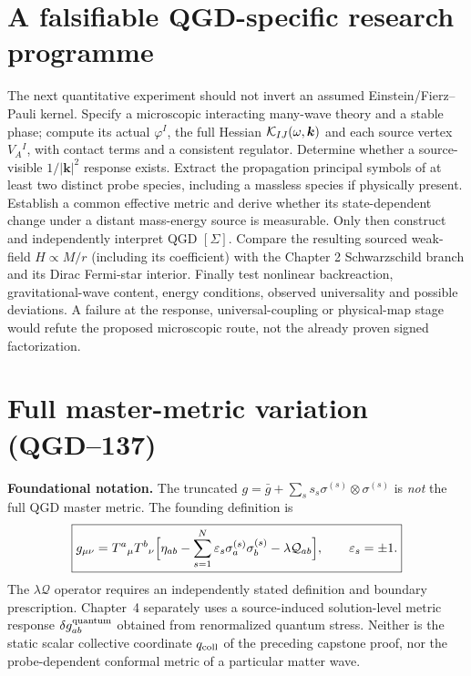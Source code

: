 \documentclass[11pt,a4paper]{article}
\theoremstyle{remark}\newtheorem{remark}[theorem]{Remark}
\begin{document}
\section{A falsifiable QGD-specific research programme}
The next quantitative experiment should not invert an assumed Einstein/Fierz--Pauli kernel. Specify a microscopic interacting many-wave theory and a stable phase; compute its actual $\varphi^I$, the full Hessian $\mathcal K_{IJ}(\omega,\bm k)$ and each source vertex $V_A{}^I$, with contact terms and a consistent regulator. Determine whether a source-visible $1/|\bm k|^2$ response exists. Extract the propagation principal symbols of at least two distinct probe species, including a massless species if physically present. Establish a common effective metric and derive whether its state-dependent change under a distant mass-energy source is measurable. Only then construct and independently interpret QGD $[\Sigma]$. Compare the resulting sourced weak-field $H\propto M/r$ (including its coefficient) with the Chapter 2 Schwarzschild branch and its Dirac Fermi-star interior. Finally test nonlinear backreaction, gravitational-wave content, energy conditions, observed universality and possible deviations. A failure at the response, universal-coupling or physical-map stage would refute the proposed microscopic route, not the already proven signed factorization.



\section{Full master-metric variation (QGD--137)}
\label{sec:v32-fullmaster}
\textbf{Foundational notation.} The truncated
$g=\bar g+\sum_s s_s\sigma^{(s)}\otimes\sigma^{(s)}$
is \emph{not} the full QGD master metric. The founding definition is
\begin{equation}\label{eq:v32-master}
\boxed{g_{\mu\nu}=T^a{}_{\mu}T^b{}_{\nu}
\Bigl[\eta_{ab}-\sum_{s=1}^N\varepsilon_s
\sigma_a^{(s)}\sigma_b^{(s)}-\lambda\mathcal Q_{ab}\Bigr],
\qquad \varepsilon_s=\pm1.}
\end{equation}
The $\lambda\mathcal Q$ operator requires an independently
stated definition and boundary prescription. Chapter~4 separately
uses a source-induced solution-level metric response $\delta g^{\rm quantum}_{ab}$ obtained from
renormalized quantum stress. Neither is the static scalar collective
coordinate $q_{\rm coll}$ of the preceding capstone proof, nor the
probe-dependent conformal metric of a particular matter wave.
\end{document}
